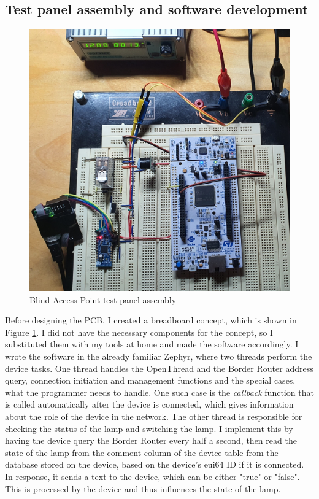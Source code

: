\subsection{Test panel assembly and software development}
\begin{figure}[!htb]
    \centering
    \includegraphics[width=\textwidth]{img/breadboard.jpg}
    \caption{Blind Access Point test panel assembly}
    \label{fig:breadboard}
\end{figure}
\noindent
Before designing the PCB, I created a breadboard concept, which is shown in Figure \ref{fig:breadboard}. I did not have the necessary components for the concept, so I substituted them with my tools at home and made the software accordingly. I wrote the software in the already familiar Zephyr, where two threads perform the device tasks. One thread handles the OpenThread and the Border Router address query, connection initiation and management functions and the special cases, what the programmer needs to handle. One such case is the \textit{callback} function that is called automatically after the device is connected, which gives information about the role of the device in the network. The other thread is responsible for checking the status of the lamp and switching the lamp. I implement this by having the device query the Border Router every half a second, then read the state of the lamp from the comment column of the device table from the database stored on the device, based on the device's eui64 ID if it is connected. In response, it sends a text to the device, which can be either "true" or "false". This is processed by the device and thus influences the state of the lamp.


